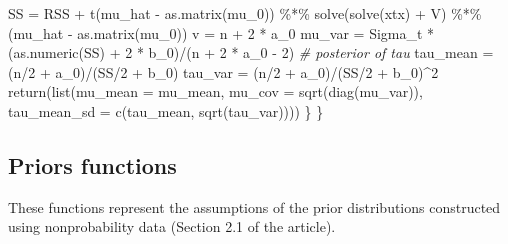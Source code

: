 \documentclass[
]{article}
\newenvironment{Shaded}{\begin{snugshade}}{\end{snugshade}}
\newcommand{\AttributeTok}[1]{\textcolor[rgb]{0.77,0.63,0.00}{#1}}
\newcommand{\CommentTok}[1]{\textcolor[rgb]{0.56,0.35,0.01}{\textit{#1}}}
\newcommand{\DecValTok}[1]{\textcolor[rgb]{0.00,0.00,0.81}{#1}}
\newcommand{\FunctionTok}[1]{\textcolor[rgb]{0.00,0.00,0.00}{#1}}
\newcommand{\NormalTok}[1]{#1}
\newcommand{\OtherTok}[1]{\textcolor[rgb]{0.56,0.35,0.01}{#1}}
\newcommand{\SpecialCharTok}[1]{\textcolor[rgb]{0.00,0.00,0.00}{#1}}
\begin{document}
\begin{Shaded}
\begin{Highlighting}[]
\NormalTok{        SS }\OtherTok{=}\NormalTok{ RSS }\SpecialCharTok{+} \FunctionTok{t}\NormalTok{(mu\_hat }\SpecialCharTok{{-}} \FunctionTok{as.matrix}\NormalTok{(mu\_0)) }\SpecialCharTok{\%*\%} \FunctionTok{solve}\NormalTok{(}\FunctionTok{solve}\NormalTok{(xtx) }\SpecialCharTok{+}\NormalTok{ V) }\SpecialCharTok{\%*\%}\NormalTok{ (mu\_hat }\SpecialCharTok{{-}} 
            \FunctionTok{as.matrix}\NormalTok{(mu\_0))}
\NormalTok{        v }\OtherTok{=}\NormalTok{ n }\SpecialCharTok{+} \DecValTok{2} \SpecialCharTok{*}\NormalTok{ a\_0}
\NormalTok{        mu\_var }\OtherTok{=}\NormalTok{ Sigma\_t }\SpecialCharTok{*}\NormalTok{ (}\FunctionTok{as.numeric}\NormalTok{(SS) }\SpecialCharTok{+} \DecValTok{2} \SpecialCharTok{*}\NormalTok{ b\_0)}\SpecialCharTok{/}\NormalTok{(n }\SpecialCharTok{+} \DecValTok{2} \SpecialCharTok{*}\NormalTok{ a\_0 }\SpecialCharTok{{-}} \DecValTok{2}\NormalTok{)}
        \CommentTok{\# posterior of tau}
\NormalTok{        tau\_mean }\OtherTok{=}\NormalTok{ (n}\SpecialCharTok{/}\DecValTok{2} \SpecialCharTok{+}\NormalTok{ a\_0)}\SpecialCharTok{/}\NormalTok{(SS}\SpecialCharTok{/}\DecValTok{2} \SpecialCharTok{+}\NormalTok{ b\_0)}
\NormalTok{        tau\_var }\OtherTok{=}\NormalTok{ (n}\SpecialCharTok{/}\DecValTok{2} \SpecialCharTok{+}\NormalTok{ a\_0)}\SpecialCharTok{/}\NormalTok{(SS}\SpecialCharTok{/}\DecValTok{2} \SpecialCharTok{+}\NormalTok{ b\_0)}\SpecialCharTok{\^{}}\DecValTok{2}
        \FunctionTok{return}\NormalTok{(}\FunctionTok{list}\NormalTok{(}\AttributeTok{mu\_mean =}\NormalTok{ mu\_mean, }\AttributeTok{mu\_cov =} \FunctionTok{sqrt}\NormalTok{(}\FunctionTok{diag}\NormalTok{(mu\_var)), }\AttributeTok{tau\_mean\_sd =} \FunctionTok{c}\NormalTok{(tau\_mean, }
            \FunctionTok{sqrt}\NormalTok{(tau\_var))))}
\NormalTok{    \}}
\NormalTok{\}}
\end{Highlighting}
\end{Shaded}

\hypertarget{priors-functions}{%
\subsection{Priors functions}\label{priors-functions}}

These functions represent the assumptions of the prior distributions
constructed using nonprobability data (Section 2.1 of the article).
\end{document}
